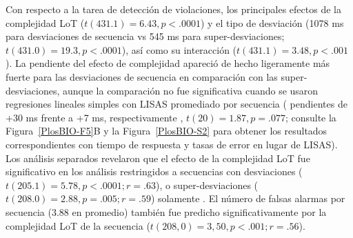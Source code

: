 Con respecto a la tarea de detección de violaciones, los principales efectos de la complejidad LoT ($t ( 431.1) = 6.43, p <.0001$) y el tipo de desviación (1078 ms para desviaciones de secuencia vs 545 ms para super-desviaciones; $t ( 431.0) = 19.3, p <.0001$), así como su interacción ($t ( 431.1) = 3.48, p <.001$). La pendiente del efecto de complejidad apareció de hecho ligeramente más fuerte para las desviaciones de secuencia en comparación con las super-desviaciones, aunque la comparación no fue significativa cuando se usaron regresiones lineales simples con LISAS promediado por secuencia ( pendientes de +30 ms frente a +7 ms, respectivamente , $t (20) = 1.87, p = .077$; consulte la Figura~\ref{PlosBIO-F5}B y la Figura~\ref{PlosBIO-S2} para obtener los resultados correspondientes con tiempo de respuesta y tasas de error en lugar de LISAS). Los análisis separados revelaron que el efecto de la complejidad LoT fue significativo en los análisis restringidos a secuencias con desviaciones ($t ( 205.1) = 5.78, p <.0001; r = .63$), o super-desviaciones ($t ( 208.0) = 2.88, p = .005; r = .59$) solamente . El número de falsas alarmas por secuencia (3.88 en promedio) también fue predicho significativamente por la complejidad LoT de la secuencia ($t ( 208,0) = 3,50, p <.001; r = .56$).


